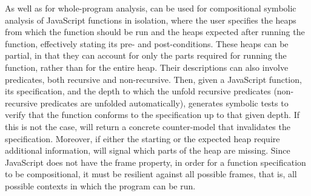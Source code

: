 
As well as for whole-program analysis, \cosette can be used for compositional symbolic analysis of JavaScript functions in isolation, where the user specifies the heaps from which the function should be run and the heaps expected after running the function, effectively stating its pre- and post-conditions. These heaps can be partial, in that they can account for only the parts required for running the function, rather than for the entire heap. Their descriptions can also involve predicates, both recursive and non-recursive.
Then, given a JavaScript function, its specification, and the depth to which the unfold recursive predicates (non-recursive predicates are unfolded automatically), \cosette generates symbolic tests to verify that the function conforms to the specification up to that given depth. If this is not the case, \cosette will return a concrete counter-model that invalidates the specification. Moreover, if either the starting or the expected heap require additional information, \cosette will signal which parts of the heap are missing.
Since JavaScript does not have the frame property, in order for a function specification  to be compositional, it must be resilient against all possible frames, that is, all possible contexts in which the program can be run. 



